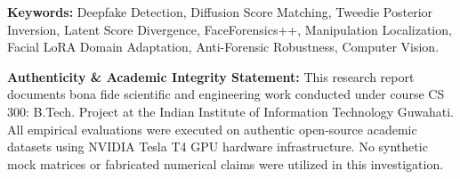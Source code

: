 \documentclass[12pt,a4paper]{report}
\begin{document}
\vspace{0.4cm}
\noindent\textbf{Keywords:} Deepfake Detection, Diffusion Score Matching, Tweedie Posterior Inversion, Latent Score Divergence, FaceForensics++, Manipulation Localization, Facial LoRA Domain Adaptation, Anti-Forensic Robustness, Computer Vision.

\vspace{0.4cm}
\noindent\textbf{Authenticity \& Academic Integrity Statement:} This research report documents bona fide scientific and engineering work conducted under course CS 300: B.Tech. Project at the Indian Institute of Information Technology Guwahati. All empirical evaluations were executed on authentic open-source academic datasets using NVIDIA Tesla T4 GPU hardware infrastructure. No synthetic mock matrices or fabricated numerical claims were utilized in this investigation.

\clearpage

\tableofcontents
\clearpage

\listoffigures
\vspace{0.8cm}
\listoftables
\vspace{0.8cm}
\end{document}
